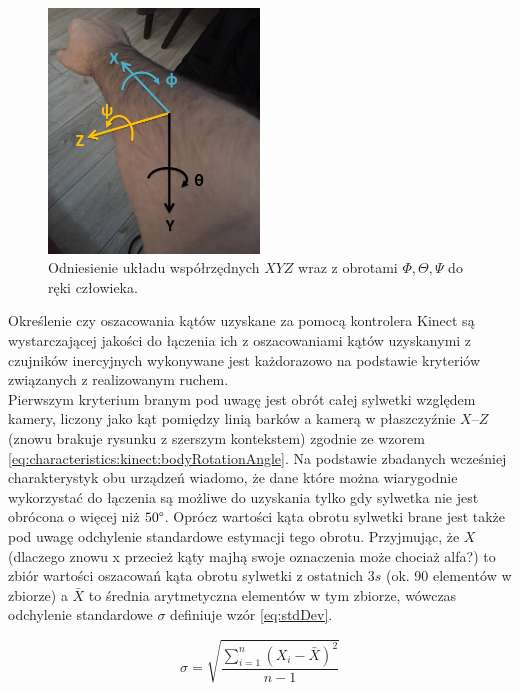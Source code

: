 \begin{figure}[!htb]
	\centering	
		\includegraphics[width=0.5\textwidth]{images/handAxes.jpg}	
	\caption{Odniesienie układu współrzędnych $XYZ$ wraz z obrotami $\Phi , \Theta , \Psi$ do ręki człowieka.}
	\label{fig:handAxes}
\end{figure}

Określenie czy oszacowania kątów uzyskane za pomocą kontrolera Kinect są wystarczającej jakości do łączenia ich z oszacowaniami kątów uzyskanymi z czujników inercyjnych wykonywane jest każdorazowo na podstawie kryteriów związanych z realizowanym ruchem. \\
Pierwszym kryterium branym pod uwagę jest obrót całej sylwetki względem kamery, liczony jako kąt pomiędzy linią barków a kamerą w płaszczyźnie $X$--$Z$ (znowu brakuje rysunku z szerszym kontekstem) zgodnie ze wzorem \eqref{eq:characteristics:kinect:bodyRotationAngle}. Na podstawie zbadanych wcześniej charakterystyk obu urządzeń wiadomo, że dane które można wiarygodnie wykorzystać do łączenia są możliwe do uzyskania tylko gdy sylwetka nie jest obrócona o więcej niż $50\degree$. Oprócz wartości kąta obrotu sylwetki brane jest także pod uwagę odchylenie standardowe estymacji tego obrotu. Przyjmując, że $X$ (dlaczego znowu x przecież kąty majhą swoje oznaczenia może chociaż alfa?) to zbiór wartości oszacowań kąta obrotu sylwetki z ostatnich $3s$ (ok. 90 elementów w zbiorze) a $\bar{X}$ to średnia arytmetyczna elementów w tym zbiorze, wówczas odchylenie standardowe $\sigma$ definiuje wzór \eqref{eq:stdDev}.

\begin{equation}
\sigma = \sqrt{\frac{\sum_{i=1}^{n}{(X_i - \bar{X})^2}}{n-1}}
\label{eq:stdDev}
\end{equation}

